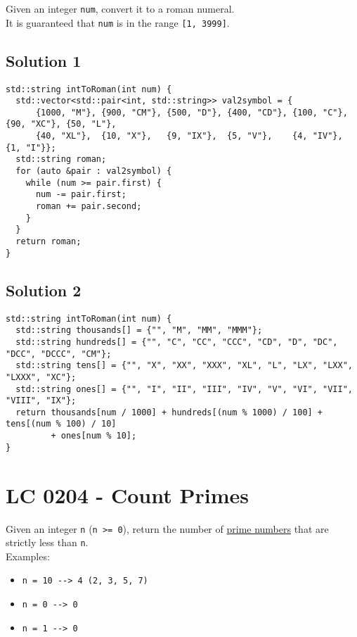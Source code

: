 Given an integer {\colorbox{CodeBackground}{\lstinline|num|}}, convert it to a roman numeral. \\

It is guaranteed that {\colorbox{CodeBackground}{\lstinline|num|}} is in the range {\colorbox{CodeBackground}{\lstinline|[1, 3999]|}}.

\subsection*{Solution 1}
\begin{lstlisting}
std::string intToRoman(int num) {
  std::vector<std::pair<int, std::string>> val2symbol = {
      {1000, "M"}, {900, "CM"}, {500, "D"}, {400, "CD"}, {100, "C"}, {90, "XC"}, {50, "L"},
      {40, "XL"},  {10, "X"},   {9, "IX"},  {5, "V"},    {4, "IV"},  {1, "I"}};
  std::string roman;
  for (auto &pair : val2symbol) {
    while (num >= pair.first) {
      num -= pair.first;
      roman += pair.second;
    }
  }
  return roman;
}
\end{lstlisting}

\subsection*{Solution 2}
\begin{lstlisting}
std::string intToRoman(int num) {
  std::string thousands[] = {"", "M", "MM", "MMM"};
  std::string hundreds[] = {"", "C", "CC", "CCC", "CD", "D", "DC", "DCC", "DCCC", "CM"};
  std::string tens[] = {"", "X", "XX", "XXX", "XL", "L", "LX", "LXX", "LXXX", "XC"};
  std::string ones[] = {"", "I", "II", "III", "IV", "V", "VI", "VII", "VIII", "IX"};
  return thousands[num / 1000] + hundreds[(num % 1000) / 100] + tens[(num % 100) / 10]
         + ones[num % 10];
}
\end{lstlisting}

\section{LC 0204 - Count Primes}
Given an integer {\colorbox{CodeBackground}{\lstinline|n|}} ({\colorbox{CodeBackground}{\lstinline|n >= 0|}}), return the number of \ul{prime numbers} that are strictly less than {\colorbox{CodeBackground}{\lstinline|n|}}.\\

Examples:
\begin{itemize}
\item {\colorbox{CodeBackground}{\lstinline|n = 10 --> 4 (2, 3, 5, 7)|}}
\item {\colorbox{CodeBackground}{\lstinline|n = 0 --> 0|}}
\item {\colorbox{CodeBackground}{\lstinline|n = 1 --> 0|}}
\end{itemize}

